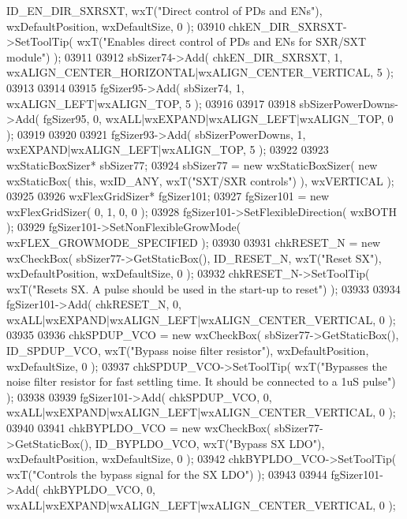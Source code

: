 \begin{DoxyCode}
      ID_EN_DIR_SXRSXT, wxT(\textcolor{stringliteral}{"Direct control of PDs and ENs"}), wxDefaultPosition, wxDefaultSize, 0 );
03910     chkEN_DIR_SXRSXT->SetToolTip( wxT(\textcolor{stringliteral}{"Enables direct control of PDs and ENs for SXR/SXT module"}) );
03911     
03912     sbSizer74->Add( chkEN_DIR_SXRSXT, 1, wxALIGN\_CENTER\_HORIZONTAL|wxALIGN\_CENTER\_VERTICAL, 5 );
03913     
03914     
03915     fgSizer95->Add( sbSizer74, 1, wxALIGN\_LEFT|wxALIGN\_TOP, 5 );
03916     
03917     
03918     sbSizerPowerDowns->Add( fgSizer95, 0, wxALL|wxEXPAND|wxALIGN\_LEFT|wxALIGN\_TOP, 0 );
03919     
03920     
03921     fgSizer93->Add( sbSizerPowerDowns, 1, wxEXPAND|wxALIGN\_LEFT|wxALIGN\_TOP, 5 );
03922     
03923     wxStaticBoxSizer* sbSizer77;
03924     sbSizer77 = \textcolor{keyword}{new} wxStaticBoxSizer( \textcolor{keyword}{new} wxStaticBox( \textcolor{keyword}{this}, wxID\_ANY, wxT(\textcolor{stringliteral}{"SXT/SXR controls"}) ), 
      wxVERTICAL );
03925     
03926     wxFlexGridSizer* fgSizer101;
03927     fgSizer101 = \textcolor{keyword}{new} wxFlexGridSizer( 0, 1, 0, 0 );
03928     fgSizer101->SetFlexibleDirection( wxBOTH );
03929     fgSizer101->SetNonFlexibleGrowMode( wxFLEX\_GROWMODE\_SPECIFIED );
03930     
03931     chkRESET_N = \textcolor{keyword}{new} wxCheckBox( sbSizer77->GetStaticBox(), ID_RESET_N, wxT(\textcolor{stringliteral}{"Reset SX"}), wxDefaultPosition,
       wxDefaultSize, 0 );
03932     chkRESET_N->SetToolTip( wxT(\textcolor{stringliteral}{"Resets SX. A pulse should be used in the start-up to reset"}) );
03933     
03934     fgSizer101->Add( chkRESET_N, 0, wxALL|wxEXPAND|wxALIGN\_LEFT|wxALIGN\_CENTER\_VERTICAL, 0 );
03935     
03936     chkSPDUP_VCO = \textcolor{keyword}{new} wxCheckBox( sbSizer77->GetStaticBox(), ID_SPDUP_VCO, wxT(\textcolor{stringliteral}{"Bypass noise filter
       resistor"}), wxDefaultPosition, wxDefaultSize, 0 );
03937     chkSPDUP_VCO->SetToolTip( wxT(\textcolor{stringliteral}{"Bypasses the noise filter resistor for fast settling time. It should be
       connected to a 1uS pulse"}) );
03938     
03939     fgSizer101->Add( chkSPDUP_VCO, 0, wxALL|wxEXPAND|wxALIGN\_LEFT|wxALIGN\_CENTER\_VERTICAL, 0 );
03940     
03941     chkBYPLDO_VCO = \textcolor{keyword}{new} wxCheckBox( sbSizer77->GetStaticBox(), ID_BYPLDO_VCO, wxT(\textcolor{stringliteral}{"Bypass SX LDO"}), 
      wxDefaultPosition, wxDefaultSize, 0 );
03942     chkBYPLDO_VCO->SetToolTip( wxT(\textcolor{stringliteral}{"Controls the bypass signal for the SX LDO"}) );
03943     
03944     fgSizer101->Add( chkBYPLDO_VCO, 0, wxALL|wxEXPAND|wxALIGN\_LEFT|wxALIGN\_CENTER\_VERTICAL, 0 );

\end{DoxyCode}
